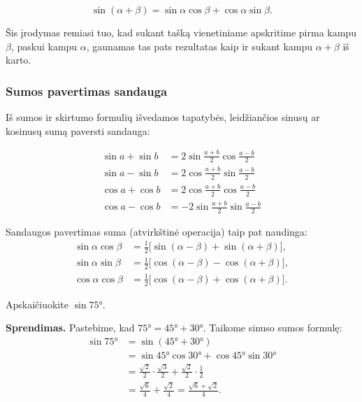 \[
  \sin(\alpha + \beta) = \sin\alpha\cos\beta + \cos\alpha\sin\beta.
\]

Šis įrodymas remiasi tuo, kad sukant tašką vienetiniame apskritime pirma
kampu $\beta$, paskui kampu $\alpha$, gaunamas tas pats rezultatas kaip ir
sukant kampu $\alpha + \beta$ iš karto.

\subsubsection*{Sumos pavertimas sandauga}

Iš sumos ir skirtumo formulių išvedamos tapatybės, leidžiančios sinusų
ar kosinusų sumą paversti sandauga:

\begin{tcolorbox}[colback=green!5!white, colframe=green!60!black,
    title=Sumos pavertimas sandauga]
\begin{align}
  \sin a + \sin b &= 2\sin\frac{a+b}{2}\cos\frac{a-b}{2} \\
  \sin a - \sin b &= 2\cos\frac{a+b}{2}\sin\frac{a-b}{2} \\
  \cos a + \cos b &= 2\cos\frac{a+b}{2}\cos\frac{a-b}{2} \\
  \cos a - \cos b &= -2\sin\frac{a+b}{2}\sin\frac{a-b}{2}
\end{align}
\end{tcolorbox}

\begin{remark}
  Sandaugos pavertimas suma (atvirkštinė operacija) taip pat naudinga:
  \begin{align}
    \sin\alpha\cos\beta &= \tfrac{1}{2}\bigl[\sin(\alpha-\beta)+\sin(\alpha+\beta)\bigr], \\
    \sin\alpha\sin\beta &= \tfrac{1}{2}\bigl[\cos(\alpha-\beta)-\cos(\alpha+\beta)\bigr], \\
    \cos\alpha\cos\beta &= \tfrac{1}{2}\bigl[\cos(\alpha-\beta)+\cos(\alpha+\beta)\bigr].
  \end{align}
\end{remark}

\begin{example}
  Apskaičiuokite $\sin 75°$.

  \textbf{Sprendimas.} Pastebime, kad $75° = 45° + 30°$. Taikome sinuso
  sumos formulę:
  \begin{align*}
    \sin 75° &= \sin(45°+30°) \\
             &= \sin 45°\cos 30° + \cos 45°\sin 30° \\
             &= \frac{\sqrt{2}}{2}\cdot\frac{\sqrt{3}}{2}
                + \frac{\sqrt{2}}{2}\cdot\frac{1}{2} \\
             &= \frac{\sqrt{6}}{4} + \frac{\sqrt{2}}{4}
              = \frac{\sqrt{6}+\sqrt{2}}{4}.
  \end{align*}
\end{example}

